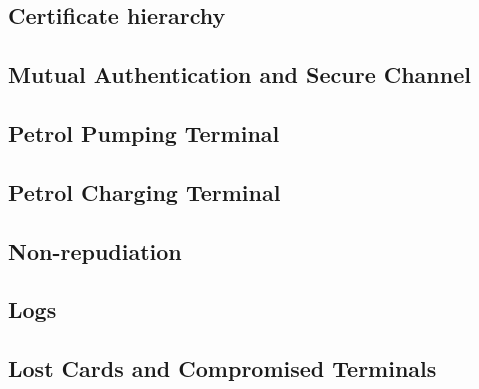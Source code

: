 \documentclass[a4paper,10pt]{llncs}
\begin{document}
\subsection{Certificate hierarchy}


\subsection{Mutual Authentication and Secure Channel}


\subsection{Petrol Pumping Terminal}


\subsection{Petrol Charging Terminal}

\subsection{Non-repudiation}
%

\subsection{Logs}
%

\subsection{Lost Cards and Compromised Terminals}
%
\end{document}
